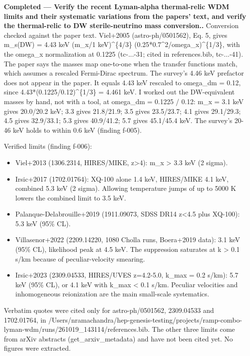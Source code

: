 \documentclass[11pt,a4paper]{article}
\begin{document}
\textbf{Completed --- Verify the recent Lyman-alpha thermal-relic WDM limits and their systematic variations from the papers' text, and verify the thermal-relic to DW sterile-neutrino mass conversion..} Conversion checked against the paper text. Viel+2005 (astro-ph/0501562), Eq. 5, gives m\_s(DW) = 4.43 keV (m\_x/1 keV)\textasciicircum{}\{4/3\} (0.25*0.7\textasciicircum{}2/omega\_x)\textasciicircum{}\{1/3\}, with the omega\_x normalization at 0.1225 (tc-...-31; cited in references.bib, tc-...-41). The paper says the masses map one-to-one when the transfer functions match, which assumes a rescaled Fermi-Dirac spectrum. The survey's 4.46 keV prefactor does not appear in the paper. It equals 4.43 keV rescaled to omega\_dm = 0.12, since 4.43*(0.1225/0.12)\textasciicircum{}\{1/3\} = 4.461 keV. I worked out the DW-equivalent masses by hand, not with a tool, at omega\_dm = 0.1225 / 0.12: m\_x = 3.1 keV gives 20.0/20.2 keV; 3.3 gives 21.8/21.9; 3.5 gives 23.5/23.7; 4.1 gives 29.1/29.3; 4.5 gives 32.9/33.1; 5.3 gives 40.9/41.2; 5.7 gives 45.1/45.4 keV. The survey's 20-46 keV holds to within 0.6 keV (finding f-005).

Verified limits (finding f-006):

\begin{itemize}
  \item Viel+2013 (1306.2314, HIRES/MIKE, z\textgreater{}4): m\_x \textgreater{} 3.3 keV (2 sigma).
  \item Irsic+2017 (1702.01764): XQ-100 alone 1.4 keV, HIRES/MIKE 4.1 keV, combined 5.3 keV (2 sigma). Allowing temperature jumps of up to 5000 K lowers the combined limit to 3.5 keV.
  \item Palanque-Delabrouille+2019 (1911.09073, SDSS DR14 z\textless{}4.5 plus XQ-100): 5.3 keV (95\% CL).
  \item Villasenor+2022 (2209.14220, 1080 Cholla runs, Boera+2019 data): 3.1 keV (95\% CL), likelihood peak at 4.5 keV. The suppression saturates at k \textgreater{} 0.1 s/km because of peculiar-velocity smearing.
  \item Irsic+2023 (2309.04533, HIRES/UVES z=4.2-5.0, k\_max = 0.2 s/km): 5.7 keV (95\% CL), or 4.1 keV with k\_max \textless{} 0.1 s/km. Peculiar velocities and inhomogeneous reionization are the main small-scale systematics.
\end{itemize}
Verbatim quotes were cited only for astro-ph/0501562, 2309.04533 and 1702.01764, in /Users/nramachandra/hep-genesis-testing/projects/ramp-combo-lyman-wdm/runs/261019\_143114/references.bib. The other three limits come from arXiv abstracts (get\_arxiv\_metadata) and have not been cited yet. No figures were extracted.
\end{document}
